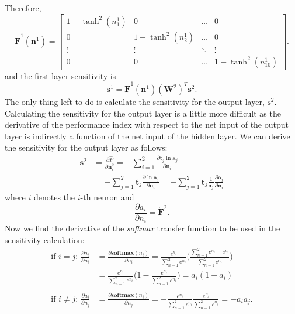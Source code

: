 \documentclass[12pt,halfline,a4paper]{ouparticle}
\begin{document}
Therefore, 
\begin{equation}
\dot{\mathbf{F}}^{1}(\mathbf{n}^{1}) = \begin{bmatrix} 1 - \tanh^{2}(n_{1}^{1}) & 0 & \ldots & 0 \\ 
0 & 1 - \tanh^{2}(n_{2}^{1}) & \ldots & 0 \\
\vdots & \vdots & \ddots & \vdots \\ 
0 & 0 & \ldots & 1 - \tanh^{2}(n_{10}^{1}) \end{bmatrix}.
\end{equation}
and the first layer sensitivity is 
\begin{equation}
\mathbf{s}^{1} = \dot{\mathbf{F}}^{1}(\mathbf{n}^{1})(\mathbf{W}^{2})^{T}\mathbf{s}^{2}.
\end{equation}
The only thing left to do is calculate the sensitivity for the output layer, $\mathbf{s}^{2}$. Calculating the sensitivity for the output layer is a little more difficult as the derivative of the performance index with respect to the net input of the output layer is indirectly a function of the net input of the hidden layer. We can derive the sensitivity for the output layer as follows: 
\begin{equation}
\begin{split}
\mathbf{s}^{2} & = \frac{\partial \hat{F}}{\partial \mathbf{n}_{i}^{2}} = - \sum_{i = 1}^{2} \frac{\partial \mathbf{t}_{j} \ln \mathbf{a}_{j}}{\partial \mathbf{n}_{i}} \\
& = - \sum_{j = 1}^{2} \mathbf{t}_{j} \frac{\partial \ln \mathbf{a}_{j}}{\partial \mathbf{n}_{i}} = - \sum_{j = 1}^{2} \mathbf{t}_{j} \frac{1}{\mathbf{a}_{j}} \frac{\partial \mathbf{a}_{j}}{\partial \mathbf{n}_{i}}
\end{split}
\end{equation}
where $i$ denotes the $i$-th neuron and 
\begin{equation}
\frac{\partial a_{i}}{\partial n_{i}} = \dot{\mathbf{F}}^{2}.
\end{equation}
Now we find the derivative of the \emph{softmax} transfer function to be used in the sensitivity calculation: 
\begin{equation}
\begin{split}
\text{if } i = j \text{: } \frac{\partial a_{i}}{\partial n_{i}} & = \frac{\partial \textbf{softmax}(n_{i})}{\partial n_{i}} = \frac{e^{n_{i}}}{\sum_{n = 1}^{2} e^{n_{i}}} \bigg(\frac{\sum_{n = 1}^{2} e^{n_{i}} - e^{n_{i}}}{\sum_{n = 1}^{2} e^{n_{i}}}\bigg) \\ 
& = \frac{e^{n_{i}}}{\sum_{n = 1}^{2} e^{n_{i}}}\bigg(1 - \frac{e^{n_{i}}}{\sum_{n = 1}^{2} e^{n_{i}}}\bigg) = a_{i}(1 - a_{i}) \\ \\
\text{if } i \neq j \text{: } \frac{\partial a_{i}}{\partial n_{j}} & = \frac{\partial \textbf{softmax}(n_{i})}{\partial n_{j}} = - \frac{e^{n_{i}}}{\sum_{n = 1}^{2} e^{n_{i}}} \frac{e^{n_{j}}}{\sum_{n = 1}^{2} e^{n_{j}}} = -a_{i}a_{j}.
\end{split}
\end{equation}
\end{document}
